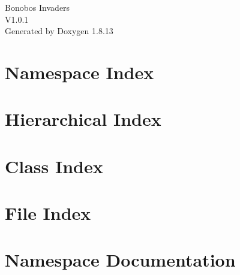 \documentclass[twoside]{book}
\newcommand{\+}{\discretionary{\mbox{\scriptsize$\hookleftarrow$}}{}{}}
\newcommand{\clearemptydoublepage}{%
  \newpage{\pagestyle{empty}\cleardoublepage}%
}
\begin{document}
\hypersetup{pageanchor=false,
             bookmarksnumbered=true,
             pdfencoding=unicode
            }
\begin{titlepage}
\vspace*{7cm}
\begin{center}%
{\Large Bonobos Invaders \\[1ex]\large V1.\+0.\+1 }\\
\vspace*{1cm}
{\large Generated by Doxygen 1.8.13}\\
\end{center}
\end{titlepage}
\clearemptydoublepage
{}
\tableofcontents
\clearemptydoublepage
{}
\hypersetup{pageanchor=true}

\chapter{Namespace Index}

\chapter{Hierarchical Index}

\chapter{Class Index}

\chapter{File Index}

\chapter{Namespace Documentation}


































\end{document}

